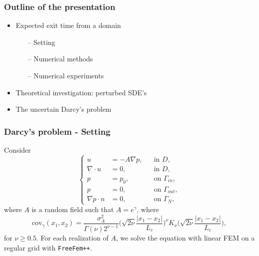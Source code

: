 \begin{frame}
\frametitle{Outline of the presentation}
\begin{itemize}
	\item \color{mygray} Expected exit time from a domain
	\begin{itemize} \color{mygray}
		\item[--] Setting
		\item[--] Numerical methods
		\item[--] Numerical experiments
	\end{itemize} 
	\item Theoretical investigation: perturbed SDE's \color{black}
	\item The uncertain Darcy's problem 
\end{itemize}
\end{frame}

\begin{frame}
\frametitle{Darcy's problem - Setting}
Consider 
\begin{equation*}
	\left \{
  	\begin{aligned}
		u &= -A \nabla p, && \text{in } D, \\
		\nabla\cdot u &= 0, && \text{in } D, \\
		p &= p_0, && \text{on } \Gamma_{in},\\
		p &= 0, && \text{on } \Gamma_{out}, \\
		\nabla p \cdot n &= 0, && \text{on } \Gamma_N,
	\end{aligned} \right.
\end{equation*}
where $A$ is a random field such that $A = e^\gamma$, where 
\begin{equation*}
	\mathrm{cov}_\gamma(x_1,x_2) = \frac{\sigma_A^2}{\Gamma(\nu)2^{\nu-1}}\Big(\sqrt{2\nu}\frac{|x_1-x_2|}{L_c}\Big)^\nu K_{\nu}\Big(\sqrt{2\nu}\frac{|x_1-x_2|}{L_c}\Big), 
\end{equation*}
for $\nu \geq 0.5$. For each realization of $A$, we solve the equation with linear FEM on a regular grid with \texttt{FreeFem++}.
\end{frame}

